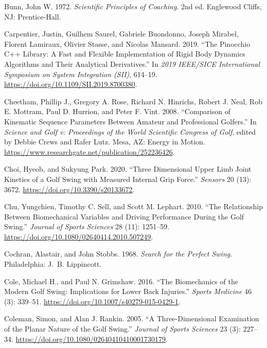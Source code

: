 \documentclass[
  letterpaper,
]{report}
\newlength{\cslhangindent}
\newenvironment{CSLReferences}[2] %
 {\begin{list}{}{%
  \setlength{\itemindent}{0pt}
  \setlength{\leftmargin}{0pt}
  \setlength{\parsep}{0pt}
  \ifodd #1
   \setlength{\leftmargin}{\cslhangindent}
   \setlength{\itemindent}{-1\cslhangindent}
  \fi
  \setlength{\itemsep}{#2\baselineskip}}}
 {\end{list}}
\begin{document}
\begin{CSLReferences}{1}{0}
Bunn, John W. 1972. \emph{Scientific Principles of Coaching}. 2nd ed.
Englewood Cliffs, NJ: Prentice-Hall.

Carpentier, Justin, Guilhem Saurel, Gabriele Buondonno, Joseph Mirabel,
Florent Lamiraux, Olivier Stasse, and Nicolas Mansard. 2019. {``The
{Pinocchio} {C++} Library: A Fast and Flexible Implementation of Rigid
Body Dynamics Algorithms and Their Analytical Derivatives.''} In
\emph{2019 {IEEE/SICE} International Symposium on System Integration
({SII})}, 614--19. \url{https://doi.org/10.1109/SII.2019.8700380}.

Cheetham, Phillip J., Gregory A. Rose, Richard N. Hinrichs, Robert J.
Neal, Rob E. Mottram, Paul D. Hurrion, and Peter F. Vint. 2008.
{``Comparison of Kinematic Sequence Parameters Between Amateur and
Professional Golfers.''} In \emph{Science and Golf v: Proceedings of the
World Scientific Congress of Golf}, edited by Debbie Crews and Rafer
Lutz. Mesa, AZ: Energy in Motion.
\url{https://www.researchgate.net/publication/252236426}.

Choi, Hyeob, and Sukyung Park. 2020. {``Three Dimensional Upper Limb
Joint Kinetics of a Golf Swing with Measured Internal Grip Force.''}
\emph{Sensors} 20 (13): 3672. \url{https://doi.org/10.3390/s20133672}.

Chu, Yungchien, Timothy C. Sell, and Scott M. Lephart. 2010. {``The
Relationship Between Biomechanical Variables and Driving Performance
During the Golf Swing.''} \emph{Journal of Sports Sciences} 28 (11):
1251--59. \url{https://doi.org/10.1080/02640414.2010.507249}.

Cochran, Alastair, and John Stobbs. 1968. \emph{Search for the Perfect
Swing}. Philadelphia: J.~B. Lippincott.

Cole, Michael H., and Paul N. Grimshaw. 2016. {``The Biomechanics of the
Modern Golf Swing: Implications for Lower Back Injuries.''} \emph{Sports
Medicine} 46 (3): 339--51.
\url{https://doi.org/10.1007/s40279-015-0429-1}.

Coleman, Simon, and Alan J. Rankin. 2005. {``A Three-Dimensional
Examination of the Planar Nature of the Golf Swing.''} \emph{Journal of
Sports Sciences} 23 (3): 227--34.
\url{https://doi.org/10.1080/02640410410001730179}.


\end{CSLReferences}
\end{document}
